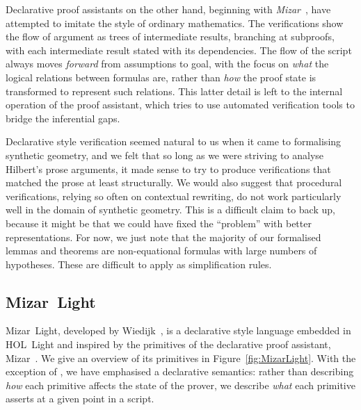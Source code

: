

Declarative proof assistants on the other hand, beginning with \emph{Mizar}~\cite{MizarMathematicalVernacular}, have attempted to imitate the style of ordinary mathematics. The verifications show the flow of argument as trees of intermediate results, branching at subproofs, with each intermediate result stated with its dependencies. The flow of the script always moves \emph{forward} from assumptions to goal, with the focus on \emph{what} the logical relations between formulas are, rather than \emph{how} the proof state is transformed to represent such relations. This latter detail is left to the internal operation of the proof assistant, which tries to use automated verification tools to bridge the inferential gaps.

Declarative style verification seemed natural to us when it came to formalising synthetic geometry, and we felt that so long as we were striving to analyse Hilbert's prose arguments, it made sense to try to produce verifications that matched the prose at least structurally. We would also suggest that procedural verifications, relying so often on contextual rewriting, do not work particularly well in the domain of synthetic geometry. This is a difficult claim to back up, because it might be that we could have fixed the ``problem'' with better representations. For now, we just note that the majority of our formalised lemmas and theorems are non-equational formulas with large numbers of hypotheses. These are difficult to apply as simplification rules.

\subsection{Mizar~Light}\label{sec:MizarLight}
Mizar~Light, developed by Wiedijk~\cite{MizarLight}, is a declarative style language embedded in HOL~Light and inspired by the primitives of the declarative proof assistant, Mizar~\cite{MizarMathematicalVernacular}. We give an overview of its primitives in Figure~\ref{fig:MizarLight}. With the exception of , we have emphasised a declarative semantics: rather than describing \emph{how} each primitive affects the state of the prover, we describe \emph{what} each primitive asserts at a given point in a script.


